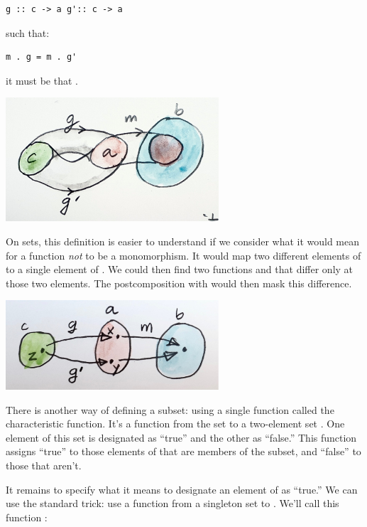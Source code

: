 \begin{verbatim}
g :: c -> a g':: c -> a
\end{verbatim}

such that:

\begin{verbatim}
m . g = m . g'
\end{verbatim}

it must be that .

\includegraphics[width=3.12500in]{images/monomorphism.jpg}

On sets, this definition is easier to understand if we consider what it
would mean for a function  \emph{not} to be a monomorphism. It
would map two different elements of  to a single element of
. We could then find two functions  and
 that differ only at those two elements. The
postcomposition with  would then mask this difference.

\includegraphics[width=3.12500in]{images/notmono.jpg}

There is another way of defining a subset: using a single function
called the characteristic function. It's a function  from the
set  to a two-element set . One element of this set
is designated as ``true'' and the other as ``false.'' This function
assigns ``true'' to those elements of  that are members of the
subset, and ``false'' to those that aren't.

It remains to specify what it means to designate an element of
 as ``true.'' We can use the standard trick: use a function
from a singleton set to . We'll call this function
:

